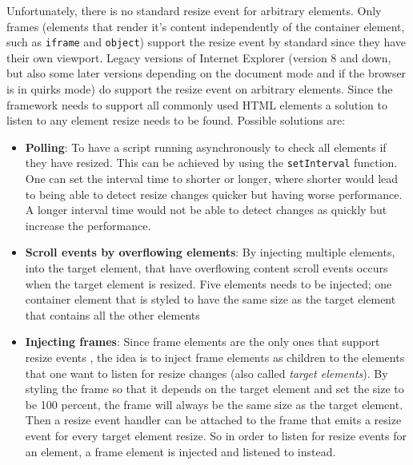 \documentclass[a4paper,11pt]{kth-mag}
\newcommand{\code}[1]{\texttt{#1}}
\begin{document}
          Unfortunately, there is no standard resize event for arbitrary \glspl{element}.
          Only frames (\glspl{element} that render it's content independently of the container \gls{element}, such as \code{iframe} and \code{object}) support the resize event by standard since they have their own \gls{viewport}.
          Legacy versions of Internet Explorer (version 8 and down, but also some later versions depending on the document mode and if the \gls{browser} is in quirks mode) do support the resize event on arbitrary \glspl{element}.
          Since the framework needs to support all commonly used \gls{HTML} \glspl{element} a solution to listen to any \gls{element} resize needs to be found.
          Possible solutions are:
          \begin{itemize}
            \item \textbf{Polling}:
              To have a script running asynchronously to check all \glspl{element} if they have resized.
              This can be achieved by using the \code{setInterval} function.
              One can set the interval time to shorter or longer, where shorter would lead to being able to detect resize changes quicker but having worse performance.
              A longer interval time would not be able to detect changes as quickly but increase the performance.
            \item \textbf{Scroll events by overflowing \glspl{element}}:
              By injecting multiple \glspl{element}, into the target \gls{element}, that have overflowing content scroll events occurs when the target \gls{element} is resized.
              Five \glspl{element} needs to be injected; one container \gls{element} that is styled to have the same size as the target \gls{element} that contains all the other \glspl{element}
            \item \textbf{Injecting frames}:
              Since frame \glspl{element} are the only ones that support resize events , the idea is to inject frame \glspl{element} as children to the \glspl{element} that one want to listen for resize changes (also called \emph{target \glspl{element}}).
              By styling the frame so that it depends on the target \gls{element} and set the size to be 100 percent, the frame will always be the same size as the target element.
              Then a resize event handler can be attached to the frame that emits a resize event for every target \gls{element} resize.
              So in order to listen for resize events for an element, a frame \gls{element} is injected and listened to instead.
          \end{itemize}
\end{document}
